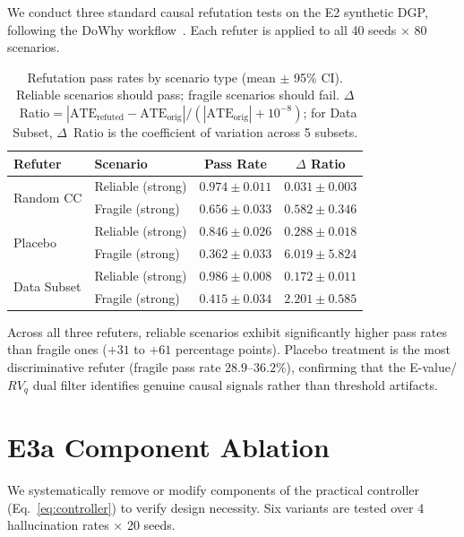 \documentclass{article}
\begin{document}
We conduct three standard causal refutation tests on the E2 synthetic
DGP, following the DoWhy workflow~\cite{dowhy2020}. Each refuter is
applied to all 40 seeds $\times$ 80 scenarios.

\begin{table}[h]
\centering
\caption{Refutation pass rates by scenario type (mean $\pm$ 95\% CI).
  Reliable scenarios should pass; fragile scenarios should fail.
  $\Delta$~Ratio${}= |\text{ATE}_{\text{refuted}} - \text{ATE}_{\text{orig}}| / (|\text{ATE}_{\text{orig}}| + 10^{-8})$;
  for Data Subset, $\Delta$~Ratio is the coefficient of variation across 5 subsets.}
\label{tab:refutation}
\small
\begin{tabular}{@{}llcc@{}}
\toprule
\textbf{Refuter} & \textbf{Scenario} & \textbf{Pass Rate} & \textbf{$\Delta$ Ratio} \\
\midrule
\multirow{2}{*}{Random CC}
  & Reliable (strong) & $0.974 \pm 0.011$ & $0.031 \pm 0.003$ \\
  & Fragile (strong)  & $0.656 \pm 0.033$ & $0.582 \pm 0.346$ \\
\midrule
\multirow{2}{*}{Placebo}
  & Reliable (strong) & $0.846 \pm 0.026$ & $0.288 \pm 0.018$ \\
  & Fragile (strong)  & $0.362 \pm 0.033$ & $6.019 \pm 5.824$ \\
\midrule
\multirow{2}{*}{Data Subset}
  & Reliable (strong) & $0.986 \pm 0.008$ & $0.172 \pm 0.011$ \\
  & Fragile (strong)  & $0.415 \pm 0.034$ & $2.201 \pm 0.585$ \\
\bottomrule
\end{tabular}
\end{table}

Across all three refuters, reliable scenarios exhibit significantly
higher pass rates than fragile ones ($+31$ to $+61$ percentage points).
Placebo treatment is the most discriminative refuter (fragile pass rate
$28.9$--$36.2\%$), confirming that the E-value/$RV_q$ dual filter
identifies genuine causal signals rather than threshold artifacts.


\section{E3a Component Ablation}
\label{sec:ablation-app}

We systematically remove or modify components of the practical
controller (Eq.~\ref{eq:controller}) to verify design necessity.
Six variants are tested over 4 hallucination rates $\times$ 20 seeds.
\end{document}
